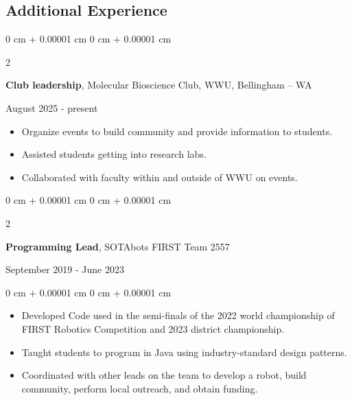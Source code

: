\documentclass[10pt, article]{article}
\newenvironment{highlights}{
    \begin{itemize}[
        topsep=0.10 cm,
        parsep=0.10 cm,
        partopsep=0pt,
        itemsep=0pt,
        leftmargin=0 cm + 10pt
    ]
}{
    \end{itemize}
} %
\newenvironment{onecolentry}{
    \begin{adjustwidth}{
        0 cm + 0.00001 cm
    }{
        0 cm + 0.00001 cm
    }
}{
    \end{adjustwidth}
} %
\newenvironment{twocolentry}[2][]{
    \onecolentry
    \def\secondColumn{#2}
    \setcolumnwidth{\fill, 4.5 cm}
    \begin{paracol}{2}
}{
    \switchcolumn \raggedleft \secondColumn
    \end{paracol}
    \endonecolentry
} %
\begin{document}
    \begin{samepage}
    \section{Additional Experience}
       
      \begin{twocolentry}
        {August 2025 - present}
        \textbf {Club leadership}, Molecular Bioscience Club, WWU, Bellingham -- WA
      \end{twocolentry}
        \begin{highlights}
        \item Organize events to build community and provide information to students.
        \item Assisted students getting into research labs.
        \item Collaborated with faculty within and outside of WWU on events.

            \end{highlights}

      \begin{twocolentry}
        {September 2019 - June 2023}
        \textbf {Programming Lead}, SOTAbots FIRST Team 2557


      \end{twocolentry}
      \begin{onecolentry}
        \begin{highlights}
      \item Developed Code used in the semi-finals of the 2022 world championship of FIRST Robotics Competition and 2023 district championship.
      \item Taught students to program in Java using industry-standard design patterns.
      \item Coordinated with other leads on the team to develop a robot, build community, perform local outreach, and obtain funding.

        \end{highlights}
      \end{onecolentry}

    \end{samepage}
\end{document}
